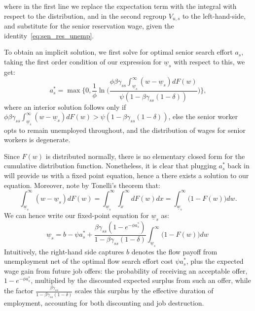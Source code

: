 \documentclass{article}
\newcommand{\lbar}[1]{\underline{#1}} %
\begin{document}
where in the first line we replace the expectation term with the integral with respect to the distribution, and in the second regroup $V_{u,s}$ to the left-hand-side, and substitute for the senior reservation wage, given the identity~\eqref{eq:sen_res_unemp}.

To obtain an implicit solution, we first solve for optimal senior search effort $a_s$, taking the first order condition of our expression for $\lbar{w}_s$ with respect to this, we get:
\[
a_s^*=\max\Biggl\{0,\frac{1}{\phi}\ln\biggl(\frac{\phi\beta\gamma_{ss}\int_{\lbar{w}_s}^\infty(w-\lbar{w}_s)dF(w)}{\psi(1-\beta\gamma_{ss}(1-\delta))}\biggr)\Biggr\},
\]
where an interior solution follows only if $\phi\beta\gamma_{ss}\int_{\lbar{w}_s}^\infty(w-\lbar{w}_s)dF(w)>\psi(1-\beta\gamma_{ss}(1-\delta))$, else the senior worker opts to remain unemployed throughout, and the distribution of wages for senior workers is degenerate.

Since $F(w)$ is distributed normally, there is no elementary closed form for the cumulative distribution function. Nonetheless, it is clear that plugging $a_s^*$ back in will provide us with a fixed point equation, hence a there exists a solution to our equation. Moreover, note by Tonelli's theorem that:
\[
\int_{\lbar{w}_s}^{\infty} (w-\lbar{w}_s)dF(w)
= \int_{\lbar{w}_s}^{\infty}\int_x^{\infty} dF(w)dx
= \int_{\lbar{w}_s}^{\infty} \bigl(1-F(w)\bigr)dw.
\]
We can hence write our fixed-point equation for $\lbar{w}_s$ as:
\begin{equation}
\lbar{w}_s=b-\psi a_s^*+\frac{\beta\gamma_{ss}(1-e^{-\phi a_s^*})}{1-\beta\gamma_{ss}(1-\delta)}\int_{\lbar{w}_s}^{\infty} \bigl(1-F(w)\bigr)dw
~\label{eq:ws_fixed_point}
\end{equation}
Intuitively, the right-hand side captures $b$ denotes the flow payoff from unemployment net of the optimal flow search effort cost $\psi a_s^*$, plus the expected wage gain from future job offers: the probability of receiving an acceptable offer, $1-e^{-\phi a_s^*}$, multiplied by the discounted expected surplus from such an offer, while the factor $\frac{\beta\gamma_{ss}}{1-\beta\gamma_{ss}(1-\delta)}$ scales this surplus by the effective duration of employment, accounting for both discounting and job destruction.
\end{document}
